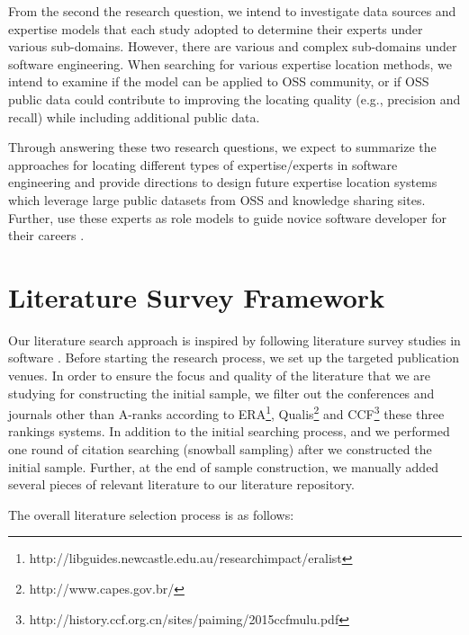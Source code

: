 \hfill\break
From the second the research question, we intend to investigate data sources and expertise models that each study adopted to determine their experts under various sub-domains. However, there are various and complex sub-domains under software engineering. When searching for various expertise location methods, we intend to examine if the model can be applied to OSS community, or if OSS public data could contribute to improving the locating quality (e.g., precision and recall) while including additional public data.

Through answering these two research questions, we expect to summarize the approaches for locating different types of expertise/experts in software engineering and provide directions to design future expertise location systems which leverage large public datasets from OSS and knowledge sharing sites. Further, use these experts as role models to guide novice software developer for their careers \cite{STEINMACHER201567}.

\section{Literature Survey Framework}

Our literature search approach is inspired by following literature survey studies in software \cite{STEINMACHER201567, Fathy2018Large}. Before starting the research process, we set up the targeted publication venues. In order to ensure the focus and quality of the literature that we are studying for constructing the initial sample, we filter out the conferences and journals other than A-ranks according to ERA\footnote{http://libguides.newcastle.edu.au/researchimpact/eralist}, Qualis\footnote{http://www.capes.gov.br/} and CCF\footnote{http://history.ccf.org.cn/sites/paiming/2015ccfmulu.pdf} these three rankings systems. In addition to the initial searching process, and we performed one round of citation searching (snowball sampling) after we constructed the initial sample. Further, at the end of sample construction, we manually added several pieces of relevant literature to our literature repository.

The overall literature selection process is as follows:


